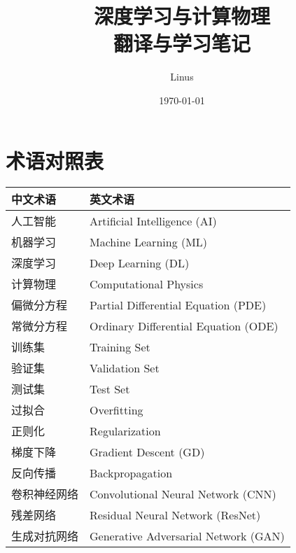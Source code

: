 \documentclass[12pt,oneside]{ctexbook}
\title{深度学习与计算物理 \\[8pt]
\Large 翻译与学习笔记}
\author{Linus}
\date{\today}
\begin{document}
\maketitle
\tableofcontents
\newpage

\chapter*{术语对照表}
\begin{longtable}{p{}p{}}
\hline
中文术语 & 英文术语 \\
\hline
人工智能 & Artificial Intelligence (AI) \\
机器学习 & Machine Learning (ML) \\
深度学习 & Deep Learning (DL) \\
计算物理 & Computational Physics \\
偏微分方程 & Partial Differential Equation (PDE) \\
常微分方程 & Ordinary Differential Equation (ODE) \\
训练集 & Training Set \\
验证集 & Validation Set \\
测试集 & Test Set \\
过拟合 & Overfitting \\
正则化 & Regularization \\
梯度下降 & Gradient Descent (GD) \\
反向传播 & Backpropagation \\
卷积神经网络 & Convolutional Neural Network (CNN) \\
残差网络 & Residual Neural Network (ResNet) \\
生成对抗网络 & Generative Adversarial Network (GAN) \\
\hline
\end{longtable}
\newpage











\end{document}
